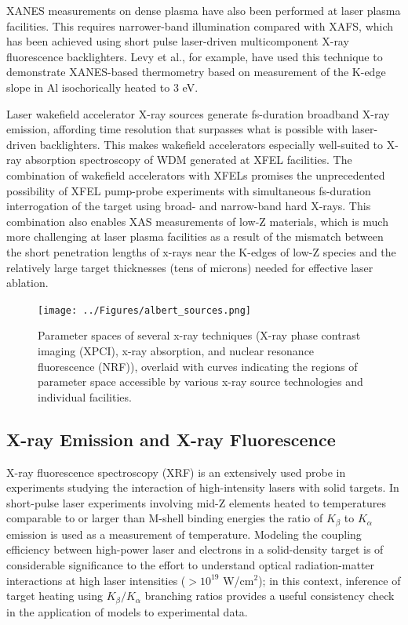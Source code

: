 \documentclass [11pt, proquest, article] {uwthesis}[2016/11/22]
\begin{document}
XANES measurements on dense plasma have also been performed at laser plasma facilities. This requires narrower-band illumination compared with XAFS, which has been achieved using short pulse laser-driven multicomponent X-ray fluorescence backlighters. Levy et al., for example, have used this technique to demonstrate XANES-based thermometry based on measurement of the K-edge slope in Al isochorically heated to 3 eV. \cite{levy2009x}

Laser wakefield accelerator X-ray sources generate fs-duration broadband X-ray emission, affording time resolution that surpasses what is possible with laser-driven backlighters. This makes wakefield accelerators especially well-suited to X-ray absorption spectroscopy of WDM generated at XFEL facilities.\cite{albert2014laser} The combination of wakefield accelerators with XFELs promises the unprecedented possibility of XFEL pump-probe experiments with simultaneous fs-duration interrogation of the target using broad- and narrow-band hard X-rays. This combination also enables XAS measurements of low-Z materials, which is much more challenging at laser plasma facilities as a result of the mismatch between the short penetration lengths of x-rays near the K-edges of low-Z species and the relatively large target thicknesses (tens of microns) needed for effective laser ablation. 

\begin{figure}[h] 
\caption{Parameter spaces of several x-ray techniques (X-ray phase contrast imaging (XPCI), x-ray absorption, and nuclear resonance fluorescence (NRF)), overlaid with curves indicating the regions of parameter space accessible by various x-ray source technologies and individual facilities.\cite{albert2014laser}}
\label{albert_sources}
\centering
\texttt{[image: ../Figures/albert\_sources.png]}
\end{figure}


\subsection{X-ray Emission and X-ray Fluorescence}
X-ray fluorescence spectroscopy (XRF) is an extensively used probe in experiments studying the interaction of high-intensity lasers with solid targets. In short-pulse laser experiments involving mid-Z elements heated to temperatures comparable to or larger than M-shell binding energies the ratio of $K_\beta$ to $K_\alpha$ emission is used as a measurement of temperature. Modeling the coupling efficiency between high-power laser and electrons in a solid-density target is of considerable significance to the effort to understand optical radiation-matter interactions at high laser intensities ($> 10^{19}$ W/cm$^2$); in this context, inference of target heating using $K_\beta/K_\alpha$ branching ratios provides a useful consistency check in the application of models to experimental data.\cite{myatt2007high, nilson2010scaling}
\end{document}
